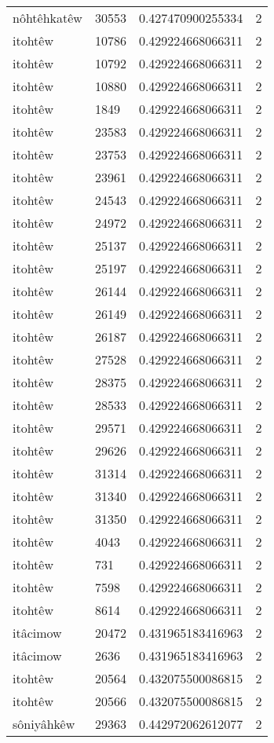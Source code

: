 \begin{longtable}{llll}
nôhtêhkatêw & 30553 & 0.427470900255334 & 2 \\
itohtêw & 10786 & 0.429224668066311 & 2 \\
itohtêw & 10792 & 0.429224668066311 & 2 \\
itohtêw & 10880 & 0.429224668066311 & 2 \\
itohtêw & 1849 & 0.429224668066311 & 2 \\
itohtêw & 23583 & 0.429224668066311 & 2 \\
itohtêw & 23753 & 0.429224668066311 & 2 \\
itohtêw & 23961 & 0.429224668066311 & 2 \\
itohtêw & 24543 & 0.429224668066311 & 2 \\
itohtêw & 24972 & 0.429224668066311 & 2 \\
itohtêw & 25137 & 0.429224668066311 & 2 \\
itohtêw & 25197 & 0.429224668066311 & 2 \\
itohtêw & 26144 & 0.429224668066311 & 2 \\
itohtêw & 26149 & 0.429224668066311 & 2 \\
itohtêw & 26187 & 0.429224668066311 & 2 \\
itohtêw & 27528 & 0.429224668066311 & 2 \\
itohtêw & 28375 & 0.429224668066311 & 2 \\
itohtêw & 28533 & 0.429224668066311 & 2 \\
itohtêw & 29571 & 0.429224668066311 & 2 \\
itohtêw & 29626 & 0.429224668066311 & 2 \\
itohtêw & 31314 & 0.429224668066311 & 2 \\
itohtêw & 31340 & 0.429224668066311 & 2 \\
itohtêw & 31350 & 0.429224668066311 & 2 \\
itohtêw & 4043 & 0.429224668066311 & 2 \\
itohtêw & 731 & 0.429224668066311 & 2 \\
itohtêw & 7598 & 0.429224668066311 & 2 \\
itohtêw & 8614 & 0.429224668066311 & 2 \\
itâcimow & 20472 & 0.431965183416963 & 2 \\
itâcimow & 2636 & 0.431965183416963 & 2 \\
itohtêw & 20564 & 0.432075500086815 & 2 \\
itohtêw & 20566 & 0.432075500086815 & 2 \\
sôniyâhkêw & 29363 & 0.442972062612077 & 2 \\

\end{longtable}
